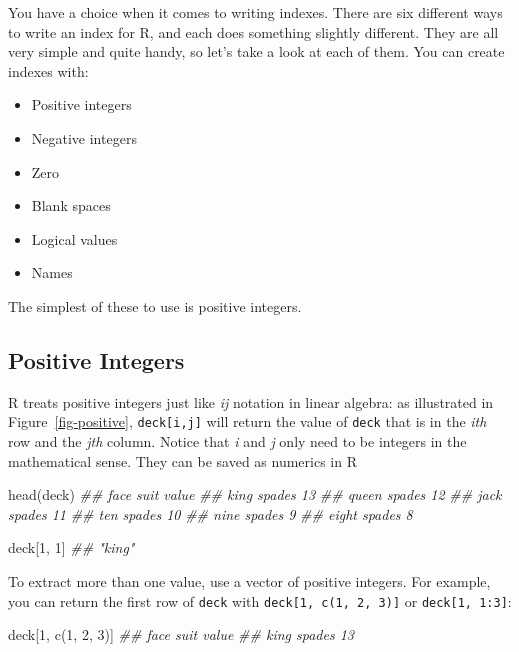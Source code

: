 \documentclass[
  letterpaper,
  DIV=11,
  numbers=noendperiod]{scrbook}
\newenvironment{Shaded}{\begin{snugshade}}{\end{snugshade}}
\newcommand{\DecValTok}[1]{\textcolor[rgb]{0.68,0.00,0.00}{#1}}
\newcommand{\DocumentationTok}[1]{\textcolor[rgb]{0.37,0.37,0.37}{\textit{#1}}}
\newcommand{\FunctionTok}[1]{\textcolor[rgb]{0.28,0.35,0.67}{#1}}
\newcommand{\NormalTok}[1]{\textcolor[rgb]{0.00,0.23,0.31}{#1}}
\providecommand{\tightlist}{%
  \setlength{\itemsep}{0pt}\setlength{\parskip}{0pt}}
\begin{document}
You have a choice when it comes to writing indexes. There are six
different ways to write an index for R, and each does something slightly
different. They are all very simple and quite handy, so let's take a
look at each of them. You can create indexes with:

\begin{itemize}
\tightlist
\item
  Positive integers
\item
  Negative integers
\item
  Zero
\item
  Blank spaces
\item
  Logical values
\item
  Names
\end{itemize}

The simplest of these to use is positive integers.

\subsection{Positive Integers}\label{positive-integers}

R treats positive integers just like \emph{ij} notation in linear
algebra: as illustrated in Figure~\ref{fig-positive},
\texttt{deck{[}i,j{]}} will return the value of \texttt{deck} that is in
the \emph{ith} row and the \emph{jth} column. Notice that \emph{i} and
\emph{j} only need to be integers in the mathematical sense. They can be
saved as numerics in R

\begin{Shaded}
\begin{Highlighting}[]
\FunctionTok{head}\NormalTok{(deck)}
\DocumentationTok{\#\#  face   suit value}
\DocumentationTok{\#\#  king spades    13}
\DocumentationTok{\#\# queen spades    12}
\DocumentationTok{\#\#  jack spades    11}
\DocumentationTok{\#\#   ten spades    10}
\DocumentationTok{\#\#  nine spades     9}
\DocumentationTok{\#\# eight spades     8}

\NormalTok{deck[}\DecValTok{1}\NormalTok{, }\DecValTok{1}\NormalTok{]}
\DocumentationTok{\#\# "king"}
\end{Highlighting}
\end{Shaded}

To extract more than one value, use a vector of positive integers. For
example, you can return the first row of \texttt{deck} with
\texttt{deck{[}1,\ c(1,\ 2,\ 3){]}} or \texttt{deck{[}1,\ 1:3{]}}:

\begin{Shaded}
\begin{Highlighting}[]
\NormalTok{deck[}\DecValTok{1}\NormalTok{, }\FunctionTok{c}\NormalTok{(}\DecValTok{1}\NormalTok{, }\DecValTok{2}\NormalTok{, }\DecValTok{3}\NormalTok{)]}
\DocumentationTok{\#\# face   suit value}
\DocumentationTok{\#\# king spades    13}
\end{Highlighting}
\end{Shaded}
\end{document}

